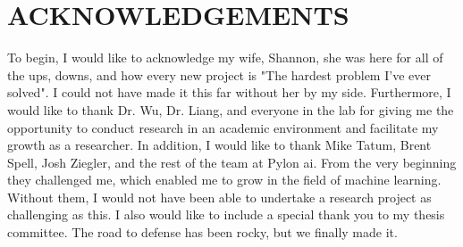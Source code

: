 \singlespacing
\chapter*{ACKNOWLEDGEMENTS}
\doublespacing
\raggedright
To begin, I would like to acknowledge my wife, Shannon, she was here for all of the ups, downs, and how every new project is "The hardest problem I've ever solved". I could not have made it this far without her by my side. Furthermore, I would like to thank Dr. Wu, Dr. Liang, and everyone in the lab for giving me the opportunity to conduct research in an academic environment and facilitate my growth as a researcher. In addition, I would like to thank Mike Tatum, Brent Spell, Josh Ziegler, and the rest of the team at Pylon ai. From the very beginning they challenged me, which enabled me to grow in the field of machine learning. Without them, I would not have been able to undertake a research project as challenging as this. I also would like to include a special thank you to my thesis committee. The road to defense has been rocky, but we finally made it.
